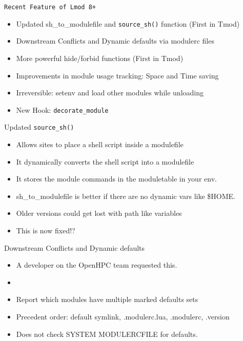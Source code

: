 \documentclass{beamer}
\begin{document}
\begin{frame}{\texttt{Recent Feature of Lmod 8+}}
  \begin{itemize}
    \item Updated sh\_to\_modulefile and \texttt{source\_sh()} function (First
      in Tmod)
    \item Downstream Conflicts and Dynamic defaults via modulerc files
    \item More powerful hide/forbid functions (First in Tmod)
    \item Improvements in module usage tracking: Space and Time saving
    \item Irreversible: setenv and load other modules while unloading
    \item New Hook: \texttt{decorate\_module}
  \end{itemize}
\end{frame}

\begin{frame}{Updated \texttt{source\_sh()}}
  \begin{itemize}
    \item Allows sites to place a shell script inside a modulefile
    \item It dynamically converts the shell script into a modulefile
    \item It stores the module commands in the moduletable in your
      env.
    \item sh\_to\_modulefile is better if there are no dynamic vars
      like \$HOME.
    \item Older versions could get lost with path like variables
    \item This is now fixed!?
  \end{itemize}
\end{frame}

\begin{frame}{Downstream Conflicts and Dynamic defaults}
  \begin{itemize}
    \item A developer on the OpenHPC team requested this.
    \item 
    \item Report which modules have multiple marked defaults sets
    \item Precedent order: default symlink, .modulerc.lua, .modulerc, .version
    \item Does not check SYSTEM MODULERCFILE for defaults.
  \end{itemize}
\end{frame}
\end{document}

